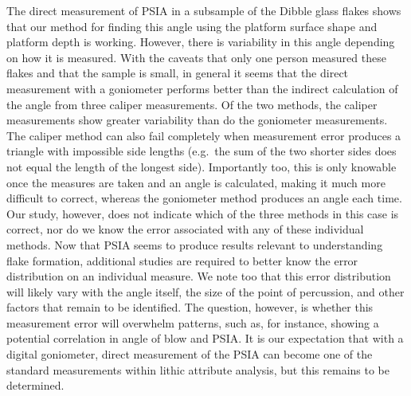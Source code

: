 \documentclass[10pt,letterpaper]{article}
\begin{document}
The direct measurement of PSIA in a subsample of the Dibble glass flakes
shows that our method for finding this angle using the platform surface
shape and platform depth is working. However, there is variability in
this angle depending on how it is measured. With the caveats that only
one person measured these flakes and that the sample is small, in
general it seems that the direct measurement with a goniometer performs
better than the indirect calculation of the angle from three caliper
measurements. Of the two methods, the caliper measurements show greater
variability than do the goniometer measurements. The caliper method can
also fail completely when measurement error produces a triangle with
impossible side lengths (e.g.~the sum of the two shorter sides does not
equal the length of the longest side). Importantly too, this is only
knowable once the measures are taken and an angle is calculated, making
it much more difficult to correct, whereas the goniometer method
produces an angle each time. Our study, however, does not indicate which
of the three methods in this case is correct, nor do we know the error
associated with any of these individual methods. Now that PSIA seems to
produce results relevant to understanding flake formation, additional
studies are required to better know the error distribution on an
individual measure. We note too that this error distribution will likely
vary with the angle itself, the size of the point of percussion, and
other factors that remain to be identified. The question, however, is
whether this measurement error will overwhelm patterns, such as, for
instance, showing a potential correlation in angle of blow and PSIA. It
is our expectation that with a digital goniometer, direct measurement of
the PSIA can become one of the standard measurements within lithic
attribute analysis, but this remains to be determined.
\end{document}
